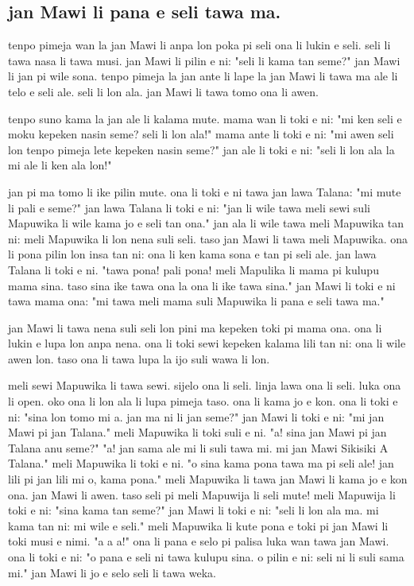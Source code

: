 \newpage
\subsection{jan Mawi li pana e seli tawa ma.}

tenpo pimeja wan la jan Mawi li anpa lon poka pi seli ona li lukin e seli. 
seli li tawa nasa li tawa musi. 
jan Mawi li pilin e ni: "seli li kama tan seme?" 
jan Mawi li jan pi wile sona. 
tenpo pimeja la jan ante li lape la jan Mawi li tawa ma ale li telo e seli ale. 
seli li lon ala. 
jan Mawi li tawa tomo ona li awen.

tenpo suno kama la jan ale li kalama mute.
mama wan li toki e ni: "mi ken seli e moku kepeken nasin seme? 
seli li lon ala!"
mama ante li toki e ni: "mi awen seli lon tenpo pimeja lete kepeken nasin seme?"
jan ale li toki e ni: "seli li lon ala la mi ale li ken ala lon!"

jan pi ma tomo li ike pilin mute. 
ona li toki e ni tawa jan lawa Talana: "mi mute li pali e seme?"
jan lawa Talana li toki e ni: "jan li wile tawa meli sewi suli Mapuwika li wile kama jo e seli tan ona."
jan ala li wile tawa meli Mapuwika tan ni: meli Mapuwika li lon nena suli seli. 
taso jan Mawi li tawa meli Mapuwika. 
ona li pona pilin lon insa tan ni: ona li ken kama sona e tan pi seli ale.
jan lawa Talana li toki e ni. 
"tawa pona!
pali pona!
meli Mapulika li mama pi kulupu mama sina. 
taso sina ike tawa ona la ona li ike tawa sina."
jan Mawi li toki e ni tawa mama ona: "mi tawa meli mama suli Mapuwika li pana e seli tawa ma."

jan Mawi li tawa nena suli seli lon pini ma kepeken toki pi mama ona. 
ona li lukin e lupa lon anpa nena. 
ona li toki sewi kepeken kalama lili tan ni: ona li wile awen lon. 
taso ona li tawa lupa la ijo suli wawa li lon.

meli sewi Mapuwika li tawa sewi. 
sijelo ona li seli. 
linja lawa ona li seli. 
luka ona li open. 
oko ona li lon ala li lupa pimeja taso. 
ona li kama jo e kon.
ona li toki e ni: "sina lon tomo mi a. 
jan ma ni li jan seme?"
jan Mawi li toki e ni: "mi jan Mawi pi jan Talana."
meli Mapuwika li toki suli e ni. 
"a! 
sina jan Mawi pi jan Talana anu seme?"
"a! 
jan sama ale mi li suli tawa mi. 
mi jan Mawi Sikisiki A Talana."
meli Mapuwika li toki e ni. 
"o sina kama pona tawa ma pi seli ale! 
jan lili pi jan lili mi o, kama pona."
meli Mapuwika li tawa jan Mawi li kama jo e kon ona. 
jan Mawi li awen. 
taso seli pi meli Mapuwija li seli mute!
meli Mapuwija li toki e ni: "sina kama tan seme?"
jan Mawi li toki e ni: "seli li lon ala ma. 
mi kama tan ni: mi wile e seli."
meli Mapuwika li kute pona e toki pi jan Mawi li toki musi e nimi. "a a a!" 
ona li pana e selo pi palisa luka wan tawa jan Mawi. 
ona li toki e ni: "o pana e seli ni tawa kulupu sina. 
o pilin e ni: seli ni li suli sama mi."
jan Mawi li jo e selo seli li tawa weka.

